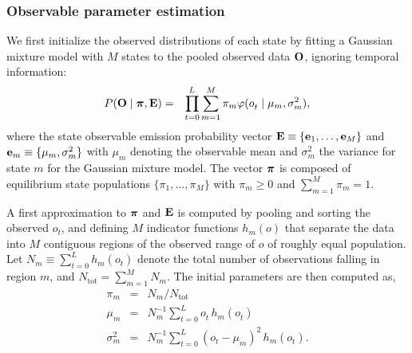 \documentclass[aps,pre,twocolumn,superscriptaddress,nofootinbib,longbibliography]{revtex4-1}
\newcommand{\bfv}[1]{{\mbox{\boldmath{$#1$}}}}
\newcommand{\bfm}[1]{{\bf #1}}
\begin{document}
{%

\subsubsection{Observable parameter estimation}

We first initialize the observed distributions of each state by fitting a Gaussian mixture model with $M$ states to the pooled observed data $\bfm{O}$, ignoring temporal information:
\begin{eqnarray}
P(\bfm{O} \mid \bfv{\pi}, \bfm{E}) &=& \prod_{t=0}^{L^{}} \sum_{m=1}^M \pi_m \varphi(o^{}_{t} \mid \mu_m, \sigma^2_m) ,
\label{equation:gaussian-mixture-likelihood}
\end{eqnarray}
where the state observable emission probability vector $\bfm{E} \equiv \{\bfm{e}_1,\ldots,\bfm{e}_M\}$ and $\bfm{e}_m \equiv \{\mu_m, \sigma_m^2\}$ with $\mu_m$ denoting the observable mean and $\sigma_m^2$ the variance for state $m$ for the Gaussian mixture model.
The vector $\bfv{\pi}$ is composed of equilibrium state populations $\{ \pi_1, \ldots , \pi_M\}$ with $\pi_m \ge 0$ and $\sum_{m=1}^M \pi_m = 1$.

A first approximation to $\bfv{\pi}$ and $\bfm{E}$ is computed by pooling and sorting the observed $o^{}_{t}$, and defining $M$ indicator functions $h_m(o)$ that separate the data into $M$ contiguous regions of the observed range of $o$ of roughly equal population.
Let $N_m \equiv \sum_{t=0}^{L^{}} h_m(o^{}_{t})$ denote the total number of observations falling in region $m$, and $N_\mathrm{tot} = \sum_{m=1}^M N_m$.
The initial parameters are then computed as,
\begin{eqnarray}
\pi_m &=& N_m / N_\mathrm{tot} \nonumber \\
\mu_m &=& N_m^{-1} \sum_{t=0}^{L^{}} o^{}_{t} \, h_m(o^{}_{t}) \\
\sigma^2_m &=& N_m^{-1} \sum_{t=0}^{L^{}} (o^{}_{t} - \mu_m)^2 \, h_m(o^{}_{t}) .
\end{eqnarray}

}
\end{document}
